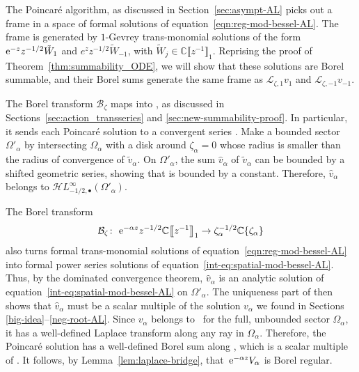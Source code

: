 \documentclass[pdftex]{sigma}
\newcommand{\singexp}[2]{\mathcal{H}L^\infty_{#1, #2}}
\newcommand{\singexpalg}[1]{\singexp{#1}{\bullet}}
\newcommand{\maps}{\colon}
\newcommand{\C}{\mathbb{C}}
\newcommand{\series}[1]{\tilde{#1}}
\newcommand{\laplace}{\mathcal{L}}
\newcommand{\borel}{\mathcal{B}}
\numberwithin{equation}{section}
\begin{document}
The Poincar\'e algorithm, as discussed in Section~\ref{sec:asympt-AL} picks out a frame in a space of formal solutions of equation~\eqref{eqn:reg-mod-bessel-AL}. The frame is generated by $1$-Gevrey trans-monomial solutions of the form ${\rm e}^{-z} z^{-1/2} \tilde{W}_1$ and $e^z z^{-1/2} \tilde{W}_{-1}$, with $\tilde{W}_j \in \C\big\llbracket z^{-1} \big\rrbracket_1$. Reprising the proof of Theorem~\ref{thm:summability_ODE}, we will show that these solutions are Borel summable, and their Borel sums generate the same frame as $\laplace_{\zeta, 1} v_1$ and $\laplace_{\zeta, -1} v_{-1}$.

The Borel transform $\borel_\zeta$ maps \smash{${\rm e}^{-\alpha z} z^{-1/2} \C\big\llbracket z^{-1} \big\rrbracket_1$} into \smash{$\zeta_\alpha^{-1/2} \C\{\zeta_\alpha\}$}, as discussed in Sections~\ref{sec:action_transseries} and \ref{sec:new-summability-proof}. In particular, it sends each Poincar\'e solution \smash{${\rm e}^{-\alpha z} z^{-1/2} \series{W}_\alpha$} to a convergent series \smash{$\series{v}_\alpha \in \zeta_\alpha^{-1/2} \C\{\zeta_\alpha\}$}. Make a bounded sector $\Omega'_\alpha$ by intersecting $\Omega_\alpha$ with a disk around $\zeta_\alpha = 0$ whose radius is smaller than the radius of convergence of $\series{v}_\alpha$. On $\Omega'_\alpha$, the sum $\hat{v}_\alpha$ of $\series{v}_\alpha$ can be bounded by a shifted geometric series, showing that  is bounded by a constant. Therefore, $\hat{v}_\alpha$ belongs to $\singexpalg{-1/2}(\Omega'_\alpha)$.

The Borel transform
\[ \borel_\zeta \maps\ {\rm e}^{-\alpha z} z^{-1/2} \C\big\llbracket z^{-1} \big\rrbracket_1 \to \zeta_\alpha^{-1/2} \C\{\zeta_\alpha\} \]
also turns formal trans-monomial solutions of equation~\eqref{eqn:reg-mod-bessel-AL} into formal power series solutions of equation~\eqref{int-eq:spatial-mod-bessel-AL}. Thus, by the dominated convergence theorem, $\hat{v}_\alpha$ is an analytic solution of equation~\eqref{int-eq:spatial-mod-bessel-AL} on $\Omega'_\alpha$. The uniqueness part of \cite[Theorem~4.6]{reg-sing-volterra} then shows that $\hat{v}_\alpha$ must be a scalar multiple of the solution $v_\alpha$ we found in Sections \ref{big-idea}--\ref{neg-root-AL}. Since $v_\alpha$ belongs to~\smash{$\singexpalg{-1/2}(\Omega_\alpha)$} for the full, unbounded sector $\Omega_\alpha$, it has a well-defined Laplace transform along any ray  in $\Omega_\alpha$. Therefore, the Poincar\'e solution \smash{${\rm e}^{-\alpha z} z^{-1/2} \series{W}_\alpha$} has a well-defined Borel sum along , which is a scalar multiple of . It follows, by Lemma~\ref{lem:laplace-bridge}, that~${\rm e}^{-\alpha z} V_\alpha$ is Borel regular.
%
\end{document}
